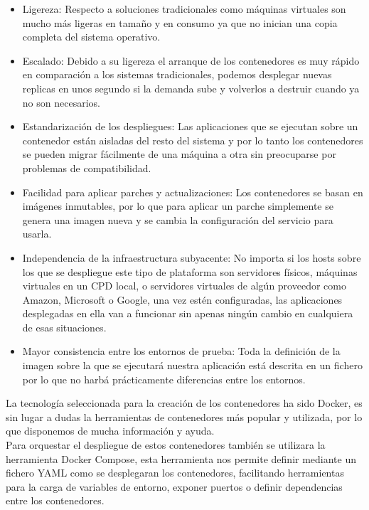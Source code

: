 \documentclass[../proyecto.tex]{subfiles}
\begin{document}
\begin{itemize}
  \item Ligereza: Respecto a soluciones tradicionales como máquinas virtuales son mucho más ligeras en tamaño y en consumo ya que no inician una copia completa del sistema operativo.
  \item Escalado: Debido a su ligereza el arranque de los contenedores es muy rápido en comparación a los sistemas tradicionales, podemos desplegar nuevas replicas en unos segundo si la demanda sube y volverlos a destruir cuando ya no son necesarios.
  \item Estandarización de los despliegues: Las aplicaciones que se ejecutan sobre un contenedor están aisladas del resto del sistema y por lo tanto los contenedores se pueden migrar fácilmente de una máquina a otra sin preocuparse por problemas de compatibilidad.
  \item Facilidad para aplicar parches y actualizaciones: Los contenedores se basan en imágenes inmutables, por lo que para aplicar un parche simplemente se genera una imagen nueva y se cambia la configuración del servicio para usarla.
  \item Independencia de la infraestructura subyacente: No importa si los hosts sobre los que se despliegue este tipo de plataforma son servidores físicos, máquinas virtuales en un CPD local, o servidores virtuales de algún proveedor como Amazon, Microsoft o Google, una vez estén configuradas, las aplicaciones desplegadas en ella van a funcionar sin apenas ningún cambio en cualquiera de esas situaciones.
  \item Mayor consistencia entre los entornos de prueba: Toda la definición de la imagen sobre la que se ejecutará nuestra aplicación está descrita en un fichero por lo que no harbá prácticamente diferencias entre los entornos.
\end{itemize}

La tecnología seleccionada para la creación de los contenedores ha sido Docker, es sin lugar a dudas la herramientas de contenedores más popular y utilizada, por lo que disponemos de mucha información y ayuda.\\

Para orquestar el despliegue de estos contenedores también se utilizara la herramienta Docker Compose, esta herramienta nos permite definir mediante un fichero YAML como se desplegaran los contenedores, facilitando herramientas para la carga de variables de entorno, exponer puertos o definir dependencias entre los contenedores.\\
\end{document}
